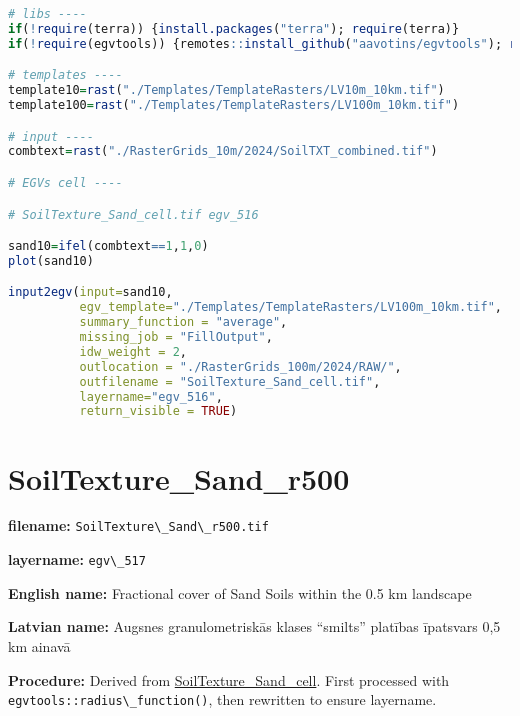 \documentclass[
]{book}
\newcommand{\passthrough}[1]{#1}
\begin{document}
\begin{lstlisting}[language=R]
# libs ----
if(!require(terra)) {install.packages("terra"); require(terra)}
if(!require(egvtools)) {remotes::install_github("aavotins/egvtools"); require(egvtools)}

# templates ----
template10=rast("./Templates/TemplateRasters/LV10m_10km.tif")
template100=rast("./Templates/TemplateRasters/LV100m_10km.tif")

# input ----
combtext=rast("./RasterGrids_10m/2024/SoilTXT_combined.tif")

# EGVs cell ----

# SoilTexture_Sand_cell.tif egv_516

sand10=ifel(combtext==1,1,0)
plot(sand10)

input2egv(input=sand10,
          egv_template="./Templates/TemplateRasters/LV100m_10km.tif",
          summary_function = "average",
          missing_job = "FillOutput",
          idw_weight = 2,
          outlocation = "./RasterGrids_100m/2024/RAW/",
          outfilename = "SoilTexture_Sand_cell.tif",
          layername="egv_516",
          return_visible = TRUE)
\end{lstlisting}

\section{SoilTexture\_Sand\_r500}\label{ch06.517}

\textbf{filename:} \passthrough{\lstinline!SoilTexture\_Sand\_r500.tif!}

\textbf{layername:} \passthrough{\lstinline!egv\_517!}

\textbf{English name:} Fractional cover of Sand Soils within the 0.5 km landscape

\textbf{Latvian name:} Augsnes granulometriskās klases ``smilts'' platības īpatsvars 0,5 km ainavā

\textbf{Procedure:} Derived from \hyperref[ch06.516]{SoilTexture\_Sand\_cell}. First processed
with \passthrough{\lstinline!egvtools::radius\_function()!}, then rewritten to ensure layername.
\end{document}
